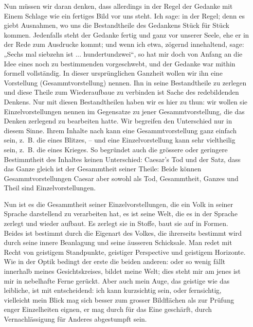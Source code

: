 \label{sp.325}

Nun müssen wir daran denken, dass allerdings in der Regel der Gedanke mit Einem Schlage wie ein fertiges Bild vor uns steht. Ich sage: in der Regel; denn es giebt Ausnahmen, wo uns die Bestandtheile des Gedankens Stück für Stück kommen. Jedenfalls steht der Gedanke fertig und ganz vor unserer Seele, ehe er in der Rede zum Ausdrucke kommt; und wenn ich etwa, zögernd innehaltend, sage: „Sechs mal siebzehn ist ... hundertundzwei“, so hat mir doch von Anfang an die Idee eines noch zu bestimmenden  vorgeschwebt, und der Gedanke war mithin formell vollständig. In dieser ursprünglichen Ganz\-\label{fp.317}heit wollen wir ihn eine Vorstellung (Gesammtvorstellung) nennen. Ihn in seine Bestandtheile zu zerlegen und diese Theile zum Wiederaufbaue zu verbinden ist Sache des redebildenden Denkens. Nur mit diesen Bestand\-theilen haben wir es hier zu thun: wir wollen sie Einzelvorstellungen nennen im Gegensatze zu jener Gesammtvorstellung, die das Denken zerlegend zu bearbeiten hatte. Wir begreifen den Unterschied  nur in diesem Sinne. Ihrem Inhalte nach kann eine Gesammtvorstellung ganz einfach sein, z.~B. die eines Blitzes, – und eine Einzelvorstellung kann sehr vieltheilig sein, z.~B. die eines Krieges. So begründet auch die grössere oder geringere Bestimmtheit des Inhaltes keinen Unterschied: Caesar’s Tod und der Satz, dass das Ganze gleich ist der Gesammtheit seiner Theile: Beide können Gesammtvorstellungen  Caesar aber sowohl als Tod, Gesammtheit, Ganzes und Theil sind Einzelvorstellungen.

Nun ist es die Gesammtheit seiner Einzelvorstellungen, die ein Volk in seiner Sprache darstellend zu verarbeiten hat, es ist seine Welt, die es in der Sprache zerlegt und wieder aufbaut. Es zerlegt sie in Stoffe, baut sie auf in Formen. Beides ist bestimmt durch die Eigenart des Volkes, die ihrerseits bestimmt wird durch seine innere Beanlagung und seine äusseren Schicksale. Man redet mit Recht von geistigem Standpunkte, geistiger \label{fp.187} Perspective und geistigem Horizonte. Wie in der Optik bedingt der erste die beiden anderen:  oder so wenig fällt innerhalb meines Gesichtskreises, bildet meine Welt; dies steht mir am  jenes ist mir in nebelhafte Ferne gerückt. Aber auch mein Auge, das geistige wie das leibliche, ist mit entscheidend: ich kann kurzsichtig sein, oder fernsichtig, vielleicht  mein Blick mag sich besser zum  grosser Bildflächen als zur Prüfung enger Einzelheiten eignen, er mag durch  für das Eine geschärft, durch Vernachlässigung für Anderes abgestumpft sein.

